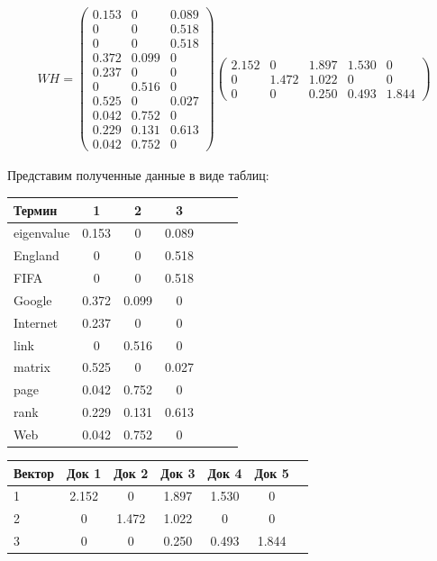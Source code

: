 \begin{align*}
W H =
\begin{pmatrix}
     0.153  &   0  &   0.089 \\
     0  &   0  &   0.518 \\
     0  &   0  &   0.518 \\
     0.372  &   0.099  &   0 \\
     0.237  &   0  &   0 \\
     0  &   0.516  &   0 \\
     0.525  &  	0  &   0.027 \\
     0.042  &   0.752  &   0 \\
     0.229  &   0.131  &   0.613 \\
     0.042  &   0.752  &   0
\end{pmatrix}
\begin{pmatrix}
     2.152  &   0  &   1.897  &   1.530  &  0 \\
     0  &   1.472  &   1.022  &   0  &   0 \\
     0  &   0  &   0.250  &   0.493  &   1.844
\end{pmatrix}
\end{align*}

 Представим полученные данные в виде таблиц:

\begin{center}
 \begin{tabular}{ l | c c c c c c }
 Термин      & 1 & 2 & 3 \\
 \hline
 eigenvalue  & 0.153  &   0  &   0.089 \\
 England     & 0  &   0  &   0.518 \\
 FIFA        & 0  &   0  &   0.518 \\
 Google      & 0.372  &   0.099  &   0 \\
 Internet    & 0.237  &   0  &   0 \\
 link        & 0  &   0.516  &   0 \\
 matrix      & 0.525  &  	0  &   0.027 \\
 page        & 0.042  &   0.752  &   0 \\
 rank        & 0.229  &   0.131  &   0.613 \\
 Web         & 0.042  &   0.752  &   0
\end{tabular}
\end{center}

\begin{center}
 \begin{tabular}{ l | c c c c c c }
 Вектор      & Док 1 & Док 2 & Док 3 & Док 4 & Док 5 \\
 \hline
 1           & 2.152  &   0  &   1.897  &   1.530  &  0 \\
 2           & 0  &   1.472  &   1.022  &   0  &   0 \\
 3           & 0  &   0  &   0.250  &   0.493  &   1.844 \\
\end{tabular}
\end{center}


